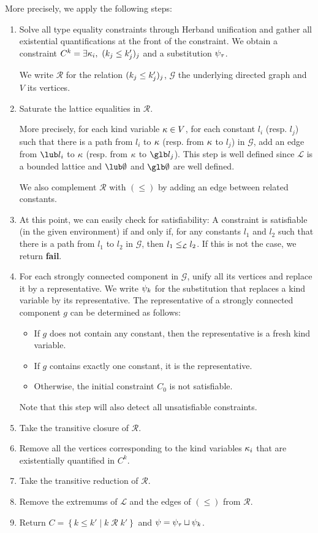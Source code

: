 More precisely, we apply the following steps:
\begin{enumerate}
\item Solve all type equality constraints through Herband unification and
  gather all existential quantifications at the front of the constraint.
  We obtain a constraint $C^k = \exists \kappa_i,\ (k_j \leq k'_j)_j$ and
  a substitution $\mathrm{\psi}_\tau$.

  We write $\mathcal R$ for the relation $(k_j \leq k'_j)_j$,
  $\mathcal G$ the underlying directed graph and $V$ its vertices.

\item Saturate the lattice equalities in $\mathcal R$.

  More precisely, for each kind variable $\kappa \in V$,
  for each constant $l_i$ (resp. $l_j$) such that
  there is a path from $l_i$ to $\kappa$ (resp. from $\kappa$ to $l_j$) in $\mathcal G$,
  add an edge from $\lub l_i$ to $\kappa$
  (resp. from $\kappa$ to $\glb l_j$).
  This step is well defined since $\mathcal L$ is a bounded lattice
  and $\lub\emptyset$ and $\glb\emptyset$ are well defined.

  We also complement $\mathcal R$ with $(\leq)$ by adding an edge
  between related constants.
\item
  At this point, we can easily check for satisfiability: A constraint
  is satisfiable (in the given environment) if and only if,
  for any constants $l_1$ and $l_2$ such that
  there is a path from $l_1$ to $l_2$ in $\mathcal G$, then $l_1\leq_\mathcal L l_2$.
  If this is not the case, we return \textbf{fail}.

\item For each strongly connected component in $\mathcal G$, unify all its vertices and replace it by a representative.
  We write $\mathrm{\psi}_k$ for the substitution that replaces a kind variable by
  its representative.
  The representative of a strongly connected component $g$ can be determined as follows:
  \begin{itemize}
  \item If $g$ does not contain any constant, then the representative
    is a fresh kind variable.
  \item If $g$ contains exactly one constant, it is the representative.
  \item Otherwise, the initial constraint $C_0$ is not satisfiable.
  \end{itemize}
  Note that this step will also detect all unsatisfiable constraints.
\item Take the transitive closure of $\mathcal R$.
\item Remove all the vertices corresponding to the kind variables $\kappa_i$
  that are existentially quantified in $C^k$.
\item Take the transitive reduction of $\mathcal R$.
\item Remove the extremums of $\mathcal L$ and the edges of $(\leq)$
  from $\mathcal R$.
\item Return $C = \left\{ k \leq k' \mid k \operatorname{\mathcal R}k' \right\}$
  and $\mathrm{\psi} =  \mathrm{\psi}_\tau \sqcup \mathrm{\psi}_k$.
\end{enumerate}

